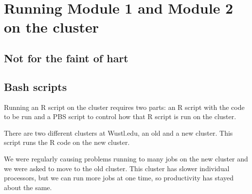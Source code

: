 \documentclass[]{book}
\newenvironment{Shaded}{\begin{snugshade}}{\end{snugshade}}
\newcommand{\CommentTok}[1]{\textcolor[rgb]{0.56,0.35,0.01}{\textit{{#1}}}}
\newcommand{\VariableTok}[1]{\textcolor[rgb]{0.00,0.00,0.00}{{#1}}}
\newcommand{\BuiltInTok}[1]{{#1}}
\newcommand{\ExtensionTok}[1]{{#1}}
\newcommand{\NormalTok}[1]{{#1}}
\theoremstyle{definition}
\theoremstyle{definition}
\theoremstyle{remark}
\begin{document}
\chapter{Running Module 1 and Module 2 on the
cluster}\label{running-module-1-and-module-2-on-the-cluster}

\section{Not for the faint of hart}\label{not-for-the-faint-of-hart}

\section{Bash scripts}\label{bash-scripts}

Running an R script on the cluster requires two parts: an R script with
the code to be run and a PBS script to control how that R script is run
on the cluster.

There are two different clusters at Wustl.edu, an old and a new cluster.
This script runs the R code on the new cluster.

\begin{Shaded}
\end{Shaded}

We were regularly causing problems running to many jobs on the new
cluster and we were asked to move to the old cluster. This cluster has
slower individual processors, but we can run more jobs at one time, so
productivity has stayed about the same.
\end{document}
